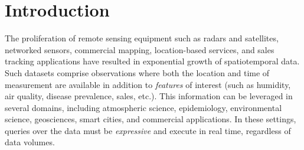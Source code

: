 \documentclass[9pt,journal,compsoc]{IEEEtran}
\begin{document}
\section{Introduction}
\label{sec:introduction}
The proliferation of remote sensing equipment such as radars and satellites, networked sensors, commercial mapping, location-based services, and sales tracking applications have resulted in exponential growth of spatiotemporal data. Such datasets comprise observations where both the location and time of measurement are available in addition to \emph{features} of interest (such as humidity, air quality, disease prevalence, sales, etc.). This information can be leveraged in several domains, including atmospheric science, epidemiology, environmental science, geosciences, smart cities, and commercial applications. In these settings, queries over the data must be \emph{expressive} and execute in real time, regardless of data volumes.
\end{document}
